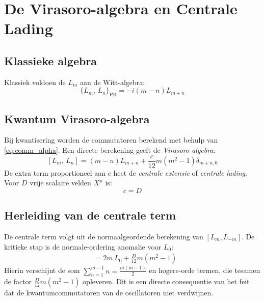 \documentclass[12pt,a4paper]{article}
\begin{document}
\section{De Virasoro-algebra en Centrale Lading}

\subsection{Klassieke algebra}

Klassiek voldoen de $L_m$ aan de Witt-algebra:
\begin{equation}
  \{L_m,\,L_n\}_{\mathrm{PB}} = -i(m-n)L_{m+n}
\end{equation}

\subsection{Kwantum Virasoro-algebra}

Bij kwantisering worden de commutatoren berekend met behulp van \eqref{eq:comm_alpha}. Een directe berekening geeft de \emph{Virasoro-algebra}:
\begin{equation}
  \boxed{[L_m,\,L_n] = (m-n)L_{m+n} + \frac{c}{12}m(m^2-1)\delta_{m+n,0}}
  \label{eq:Virasoro_algebra}
\end{equation}
De extra term proportioneel aan $c$ heet de \emph{centrale extensie} of \emph{centrale lading}. Voor $D$ vrije scalaire velden $X^\mu$ is:
\begin{equation}
  c = D
\end{equation}

\subsection{Herleiding van de centrale term}

De centrale term volgt uit de normaalgeordende berekening van $[L_m, L_{-m}]$. De kritieke stap is de normale-ordering anomalie voor $L_0$:
\begin{align}
  [L_m,L_{-m}] &= 2m\,L_0 + \frac{D}{12}m(m^2-1)
\end{align}
Hierin verschijnt de som $\sum_{n=1}^{m-1}n = \frac{m(m-1)}{2}$ en hogere-orde termen, die tesamen de factor $\frac{D}{12}m(m^2-1)$ opleveren. Dit is een directe consequentie van het feit dat de kwantumcommutatoren van de oscillatoren niet verdwijnen.

\end{document}
